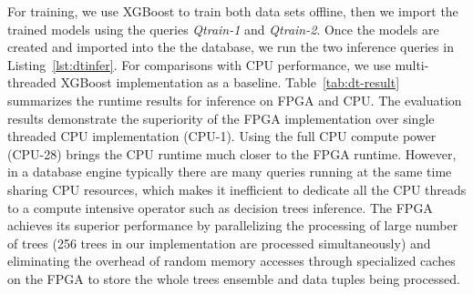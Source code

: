 \documentclass[11pt,dvipdfm]{article}
\begin{document}
For training, we use XGBoost to train both data sets offline, then we import the trained models using the queries \emph{Qtrain-1} and \emph{Qtrain-2}. Once the models are created and imported into the the database, we run the two inference queries in Listing~\ref{lst:dtinfer}.
For comparisons with CPU performance, we use multi-threaded XGBoost implementation as a baseline. Table~\ref{tab:dt-result} summarizes the runtime results for inference on FPGA and CPU.  The evaluation results demonstrate the superiority of the FPGA implementation over single threaded CPU implementation (CPU-1). Using the full CPU compute power (CPU-28) brings the CPU runtime much closer to the FPGA runtime. However, in a database engine typically there are many queries running at the same time sharing CPU resources, which makes it inefficient to dedicate all the CPU threads to a compute intensive operator such as decision trees inference. 
The FPGA achieves its superior performance by parallelizing the processing of large number of trees (256 trees in our implementation are processed simultaneously) and eliminating the overhead of random memory accesses through specialized caches on the FPGA to store the whole trees ensemble and data tuples being processed. 





\end{document}
